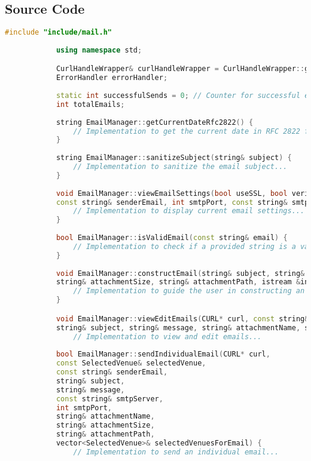 \documentclass{article}
\begin{document}
	\subsection*{Source Code}
	\begin{mdframed}[backgroundcolor=background, hidealllines=false, innerleftmargin=15pt, innerrightmargin=5pt, innertopmargin=0pt, innerbottommargin=-5pt, linecolor=accent]
		\begin{lstlisting}[language=C++]
			#include "include/mail.h"
			
			using namespace std;

			CurlHandleWrapper& curlHandleWrapper = CurlHandleWrapper::getInstance();
			ErrorHandler errorHandler;
			
			static int successfulSends = 0; // Counter for successful email sends
			int totalEmails;
			
			string EmailManager::getCurrentDateRfc2822() {
				// Implementation to get the current date in RFC 2822 format...
			}
			
			string EmailManager::sanitizeSubject(string& subject) {
				// Implementation to sanitize the email subject...
			}
			
			void EmailManager::viewEmailSettings(bool useSSL, bool verifyPeer, bool verifyHost, bool verbose,
			const string& senderEmail, int smtpPort, const string& smtpServer) {
				// Implementation to display current email settings...
			}
			
			bool EmailManager::isValidEmail(const string& email) {
				// Implementation to check if a provided string is a valid email format...
			}
			
			void EmailManager::constructEmail(string& subject, string& message, string& attachmentName, 
			string& attachmentSize, string& attachmentPath, istream &in) {
				// Implementation to guide the user in constructing an email...
			}

			void EmailManager::viewEditEmails(CURL* curl, const string& smtpServer, int smtpPort, vector<SelectedVenue>& selectedVenuesForEmail, const string& senderEmail, 
			string& subject, string& message, string& attachmentName, string& attachmentSize, string& attachmentPath, bool& templateExists) {
				// Implementation to view and edit emails...
				
			bool EmailManager::sendIndividualEmail(CURL* curl,
			const SelectedVenue& selectedVenue,
			const string& senderEmail,
			string& subject,
			string& message,
			const string& smtpServer,
			int smtpPort,
			string& attachmentName,
			string& attachmentSize,
			string& attachmentPath,
			vector<SelectedVenue>& selectedVenuesForEmail) {
				// Implementation to send an individual email...
			

\end{lstlisting}
\end{mdframed}
\end{document}
